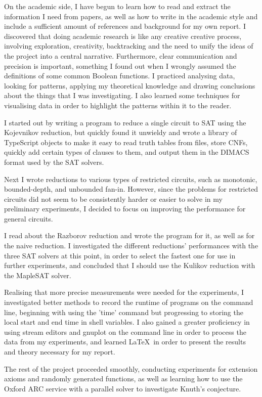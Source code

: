 \documentclass{article}
\begin{document}
On the academic side, I have begun to learn how to read and extract the information I need from papers, as well as how to write in the academic style and include a sufficient amount of references and background for my own report. I discovered that doing academic research is like any creative creative process, involving exploration, creativity, backtracking and the need to unify the ideas of the project into a central narrative. Furthermore, clear communication and precision is important, something I found out when I wrongly assumed the definitions of some common Boolean functions. I practiced analysing data, looking for patterns, applying my theoretical knowledge and drawing conclusions about the things that I was investigating. I also learned some techniques for visualising data in order to highlight the patterns within it to the reader.

I started out by writing a program to reduce a single circuit to SAT using the Kojevnikov reduction, but quickly found it unwieldy and wrote a library of TypeScript objects to make it easy to read truth tables from files, store CNFs, quickly add certain types of clauses to them, and output them in the DIMACS format used by the SAT solvers. 

Next I wrote reductions to various types of restricted circuits, such as monotonic, bounded-depth, and unbounded fan-in. However, since the problems for restricted circuits did not seem to be consistently harder or easier to solve in my preliminary experiments, I decided to focus on improving the performance for general circuits.

I read about the Razborov reduction and wrote the program for it, as well as for the naive reduction. I investigated the different reductions' performances with the three SAT solvers at this point, in order to select the fastest one for use in further experiments, and concluded that I should use the Kulikov reduction with the MapleSAT solver.

Realising that more precise measurements were needed for the experiments, I investigated better methods to record the runtime of programs on the command line, beginning with using the 'time' command but progressing to storing the local start and end time in shell variables. I also gained a greater proficiency in using stream editors and gnuplot on the command line in order to process the data from my experiments, and learned \LaTeX  \ in order to present the results and theory necessary for my report.

The rest of the project proceeded smoothly, conducting experiments for extension axioms and randomly generated functions, as well as learning how to use the Oxford ARC service with a parallel solver to investigate Knuth's conjecture. 
\end{document}
